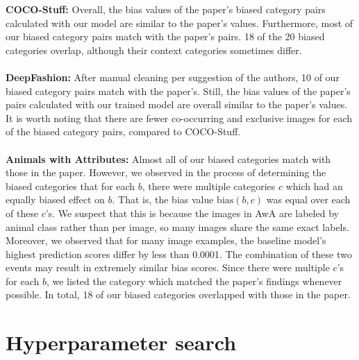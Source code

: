 \textbf{COCO-Stuff:} Overall, the bias values of the paper's biased category pairs calculated with our model are similar to the paper's values. Furthermore, most of our biased category pairs match with the paper's pairs. 18 of the 20 biased categories overlap, although their context categories sometimes differ. \\
\\
\textbf{DeepFashion:} After manual cleaning per suggestion of the authors, 10 of our biased category pairs match with the paper's. Still, the bias values of the paper's pairs calculated with our trained model are overall similar to the paper's values. It is worth noting that there are fewer co-occurring and exclusive images for each of the biased category pairs, compared to COCO-Stuff.\\
\\
\textbf{Animals with Attributes:} Almost all of our biased categories match with those in the paper. However, we observed in the process of determining the biased categories that for each $b$, there were multiple categories $c$ which had an equally biased effect on $b$. That is, the bias value $\text{bias}(b, c)$ was equal over each of these $c$'s. We suspect that this is because the images in AwA are labeled by animal class rather than per image, so many images share the same exact labels. Moreover, we observed that for many image examples, the baseline model's highest prediction scores differ by less than 0.0001. The combination of these two events may result in extremely similar bias scores. Since there were multiple $c$'s for each $b$, we listed the category which matched the paper's findings whenever possible. In total, 18 of our biased categories overlapped with those in the paper.

\setlength{\textfloatsep}{20pt}

\section{Hyperparameter search} \label{sec:hyperparametersearch}

